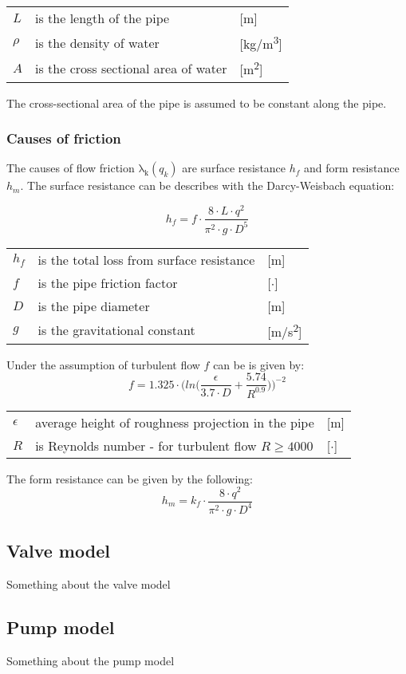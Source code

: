 	\begin{center}
		\begin{tabular}{l p{8cm} l}
			$L$ & is the length of the pipe & [\si{m}]\\
			$\rho$ & is the density of water & [\si{kg}/\si{m\cubed}]\\  
			$A$ & is the cross sectional area of water & [\si{m\squared}]\\ 
		\end{tabular}
	\end{center}
The cross-sectional area of the pipe is assumed to be constant along the pipe.


\subsubsection{Causes of friction}
The causes of flow friction $\mathrm{\lambda_{k}}(q_{k})$ are surface resistance $h_{f}$ and form resistance $h_{m}$. The surface resistance can be describes with the Darcy-Weisbach equation:

\begin{equation}
	h_{f} = f \cdot \frac{8\cdot L\cdot q^{2}}{\pi^{2}\cdot g \cdot D^{5}}
\end{equation} 

\begin{center}
	\begin{tabular}{l p{8cm} l}
		$h_{f}$ & is the total loss from surface resistance & [\si{m}]\\
		$f$ & is the pipe friction factor & [$\cdot$]\\
		$D$ & is the pipe diameter & [\si{m}]\\
		$g$ & is the gravitational constant & [\si{m}/\si{s\squared}]\\
	\end{tabular}
\end{center}
Under the assumption of turbulent flow $f$ can be is given by:
\begin{equation}
	f=1.325\cdot \Bigg(ln\Big(\frac{\epsilon}{3.7 \cdot D}+\frac{5.74}{R^{0.9}}\Big)\Bigg)^{-2}
\end{equation}

\begin{center}
	\begin{tabular}{l p{8cm} l}
		$\epsilon$ & average height of roughness projection in the pipe & [\si{m}]\\
		$R$ &  is Reynolds number - for turbulent ﬂow $R \geq 4000$ & [$\cdot$]\\
	\end{tabular}
\end{center}

The form resistance can be given by the following:
\begin{equation}
	h_{m}=k_{f}\cdot \frac{8\cdot q^{2}}{\pi^{2}\cdot g \cdot D^{4}}
\end{equation}

\subsection{Valve model}
Something about the valve model

\subsection{Pump model}
Something about the pump model

